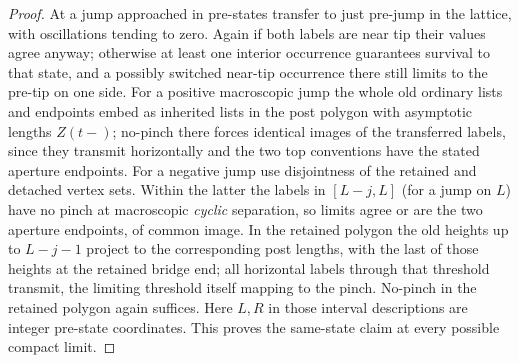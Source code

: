 \begin{proof}
At a jump approached in pre-states transfer to just pre-jump in the lattice, with oscillations tending to zero.
Again if both labels are near tip their values agree anyway; otherwise at least one interior occurrence guarantees survival to that state, and a possibly switched near-tip occurrence there still limits to the pre-tip on one side.
For a positive macroscopic jump the whole old ordinary lists and endpoints embed as inherited lists in the post polygon with asymptotic lengths \(Z(t-)\); no-pinch there forces identical images of the transferred labels, since they transmit horizontally and the two top conventions have the stated aperture endpoints.
For a negative jump use disjointness of the retained and detached vertex sets.
Within the latter the labels in \([L-j,L]\) (for a jump on \(L\)) have no pinch at macroscopic \emph{cyclic} separation, so limits agree or are the two aperture endpoints, of common image.
In the retained polygon the old heights up to \(L-j-1\) project to the corresponding post lengths, with the last of those heights at the retained bridge end; all horizontal labels through that threshold transmit, the limiting threshold itself mapping to the pinch.
No-pinch in the retained polygon again suffices.
Here \(L,R\) in those interval descriptions are integer pre-state coordinates.
This proves the same-state claim at every possible compact limit.



\end{proof}
